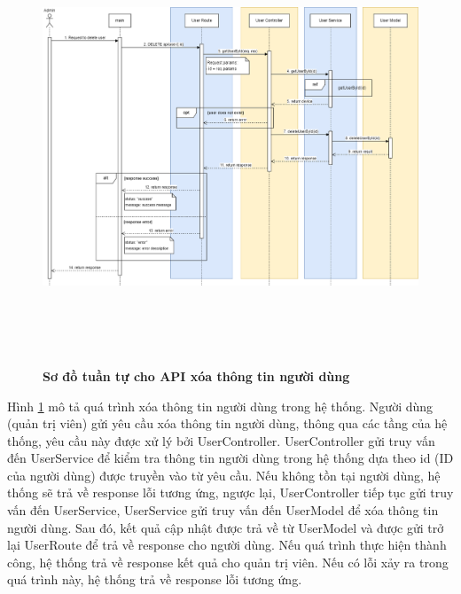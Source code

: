 \begin{figure}[H]
  \centering
  \includegraphics[width=16cm,height=13cm]{Images/sequence_api/deleteUserById.png}
  \caption[Sơ đồ tuần tự cho API xóa thông tin người dùng ]{\bfseries \fontsize{12pt}{0pt}
  \selectfont Sơ đồ tuần tự cho API xóa thông tin người dùng }
  \label{api_deleteUser} %
\end{figure}
Hình \ref{api_deleteUser} mô tả quá trình xóa thông tin người dùng trong hệ thống. Người dùng (quản trị viên) gửi yêu cầu xóa thông tin người dùng, thông qua các tầng của hệ thống, 
yêu cầu này được xử lý bởi UserController. UserController gửi truy vấn đến UserService để kiểm tra thông tin người dùng trong hệ thống dựa theo id (ID của người dùng) được truyền vào từ yêu cầu. 
Nếu không tồn tại người dùng, hệ thống sẽ trả về response lỗi tương ứng, ngược lại, UserController tiếp tục gửi truy vấn đến UserService, UserService gửi truy vấn đến UserModel để xóa thông tin
người dùng. Sau đó, kết quả cập nhật được trả về từ UserModel và được gửi trở lại UserRoute để trả về response cho người dùng. Nếu quá trình thực hiện thành công, hệ thống trả về response kết quả cho quản trị viên. Nếu có lỗi xảy ra
 trong quá trình này, hệ thống trả về response lỗi tương ứng.




